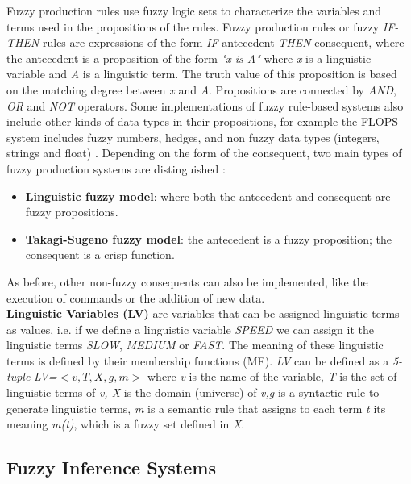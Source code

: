 Fuzzy production rules use fuzzy logic sets to characterize the
variables and terms used in the propositions of the rules. Fuzzy
production rules or fuzzy \textit{IF-THEN} rules are expressions of
the form \textit{IF} antecedent \textit{THEN} consequent, where the
antecedent is a proposition of the form \textit{"x is A"} where
\textit{x} is a linguistic variable and \textit{A} is a linguistic
term. The truth value of this proposition is based on the matching
degree between \textit{x} and \textit{A}. Propositions are connected
by \textit{AND}, \textit{OR} and \textit{NOT} operators. Some
implementations of fuzzy rule-based systems also include other kinds
of data types in their propositions, for example the FLOPS system
includes fuzzy numbers, hedges, and non fuzzy data types (integers,
strings and float) \cite{siler2005fuzzy}. Depending on the form of the
consequent, two main types of fuzzy production systems are
distinguished \cite{babuvska1996fuzzy}:
\begin{itemize}  
\item \textbf{Linguistic fuzzy model}: where both the antecedent 
and consequent are fuzzy propositions.
\item \textbf{Takagi-Sugeno fuzzy model}: the antecedent is a fuzzy 
proposition; the consequent is a crisp function.
\end{itemize}  
As before, other non-fuzzy consequents can also be implemented, like
the execution of commands or the addition of new data.\\
\textbf{Linguistic Variables (LV)} are variables that can be assigned
linguistic terms as values, i.e. if we define a linguistic variable
\textit{SPEED} we can assign it the linguistic terms \textit{SLOW},
\textit{MEDIUM} or \textit{FAST}. The meaning of these linguistic
terms is defined by their membership functions (MF). \textit{LV} can
be defined as a \textit{5-tuple} \textit{LV=}$<v,T,X,g,m>$ where
\textit{v} is the name of the variable, \textit{T} is the set of
linguistic terms of \textit{v, X} is the domain (universe) of
\textit{v,g} is a syntactic rule to generate linguistic terms,
\textit{m} is a semantic rule that assigns to each term \textit{t} its
meaning \textit{m(t)}, which is a fuzzy set defined in \textit{X}.

\subsection{Fuzzy Inference Systems}

